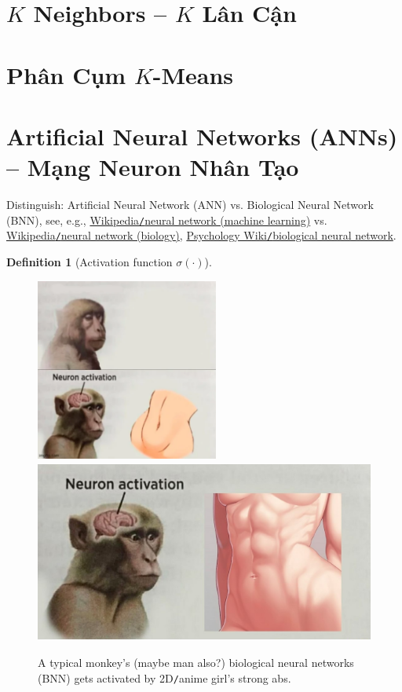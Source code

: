 \documentclass{article}
\newtheorem{definition}{Definition}
\begin{document}

\section{$K$ Neighbors -- $K$ Lân Cận}


\section{Phân Cụm $K$-Means}


\section{Artificial Neural Networks (ANNs) -- Mạng Neuron Nhân Tạo}
Distinguish: Artificial Neural Network (ANN) vs. Biological Neural Network (BNN), see, e.g., \href{https://en.wikipedia.org/wiki/Neural_network_(machine_learning)}{Wikipedia{\tt/}neural network (machine learning)} vs. \href{https://en.wikipedia.org/wiki/Neural_network_(biology)}{Wikipedia{\tt/}neural network (biology)}, \href{https://psychology.fandom.com/wiki/Biological_neural_networks}{Psychology Wiki{\tt/}biological neural network}.

\begin{definition}[Activation function $\sigma(\cdot)$]
	
\end{definition}

\begin{figure}[H]
	\centering
	\includegraphics[height=6cm]{neuron_activation_anime}\includegraphics[height=6cm]{neuron_activation}
	\caption{A typical monkey's (maybe man also?) biological neural networks (BNN) gets activated by 2D{\tt/}anime girl's strong abs.}
\end{figure}
\end{document}
